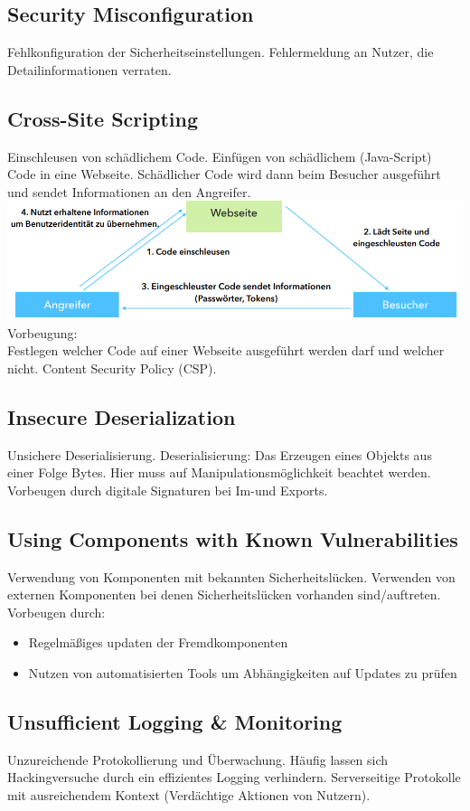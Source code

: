 \documentclass[12pt,a4paper]{article}
\begin{document}
\subsection{Security Misconfiguration}
Fehlkonfiguration der Sicherheitseinstellungen. Fehlermeldung an Nutzer, die Detailinformationen verraten. 

\subsection{Cross-Site Scripting}
Einschleusen von schädlichem Code. Einfügen von schädlichem (Java-Script) Code in eine Webseite. Schädlicher Code wird dann beim Besucher ausgeführt und sendet Informationen an den Angreifer. \\
\includegraphics[width=\textwidth]{Bilder/cross_site_scripting.PNG}
Vorbeugung:\\
Festlegen welcher Code auf einer Webseite ausgeführt werden darf und welcher nicht. Content Security Policy (CSP).

\subsection{Insecure Deserialization}
Unsichere Deserialisierung. Deserialisierung: Das Erzeugen eines Objekts aus einer Folge Bytes. Hier muss auf Manipulationsmöglichkeit beachtet werden. Vorbeugen durch digitale Signaturen bei Im-und Exports.

\subsection{Using Components with Known Vulnerabilities}
Verwendung von Komponenten mit bekannten Sicherheitslücken. Verwenden von externen Komponenten bei denen Sicherheitslücken vorhanden sind/auftreten. Vorbeugen durch:
\begin{itemize}
	\item Regelmäßiges updaten der Fremdkomponenten
	\item Nutzen von automatisierten Tools um Abhängigkeiten auf Updates zu prüfen
\end{itemize}

\subsection{Unsufficient Logging \& Monitoring}
Unzureichende Protokollierung und Überwachung. Häufig lassen sich Hackingversuche durch ein effizientes Logging verhindern. Serverseitige Protokolle mit ausreichendem Kontext (Verdächtige Aktionen von Nutzern).
\end{document}
